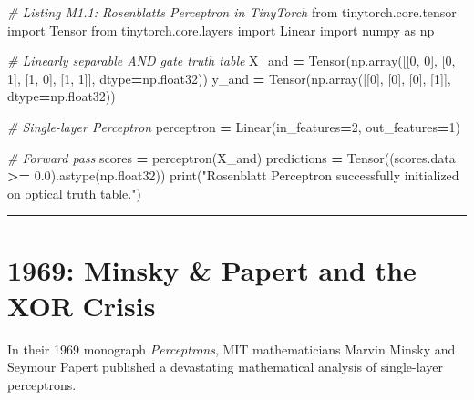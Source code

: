 \documentclass[
  letterpaper,
]{scrbook}
\newenvironment{Shaded}{\begin{snugshade}}{\end{snugshade}}
\newcommand{\BuiltInTok}[1]{#1}
\newcommand{\CommentTok}[1]{\textcolor[rgb]{0.56,0.35,0.01}{\textit{#1}}}
\newcommand{\DecValTok}[1]{\textcolor[rgb]{0.00,0.00,0.81}{#1}}
\newcommand{\FloatTok}[1]{\textcolor[rgb]{0.00,0.00,0.81}{#1}}
\newcommand{\ImportTok}[1]{#1}
\newcommand{\NormalTok}[1]{#1}
\newcommand{\OperatorTok}[1]{\textcolor[rgb]{0.81,0.36,0.00}{\textbf{#1}}}
\newcommand{\StringTok}[1]{\textcolor[rgb]{0.31,0.60,0.02}{#1}}
\begin{document}
\begin{Shaded}
\begin{Highlighting}[]
\CommentTok{\# Listing M1.1: Rosenblatt\textquotesingle{}s Perceptron in TinyTorch}
\ImportTok{from}\NormalTok{ tinytorch.core.tensor }\ImportTok{import}\NormalTok{ Tensor}
\ImportTok{from}\NormalTok{ tinytorch.core.layers }\ImportTok{import}\NormalTok{ Linear}
\ImportTok{import}\NormalTok{ numpy }\ImportTok{as}\NormalTok{ np}

\CommentTok{\# Linearly separable AND gate truth table}
\NormalTok{X\_and }\OperatorTok{=}\NormalTok{ Tensor(np.array([[}\DecValTok{0}\NormalTok{, }\DecValTok{0}\NormalTok{], [}\DecValTok{0}\NormalTok{, }\DecValTok{1}\NormalTok{], [}\DecValTok{1}\NormalTok{, }\DecValTok{0}\NormalTok{], [}\DecValTok{1}\NormalTok{, }\DecValTok{1}\NormalTok{]], dtype}\OperatorTok{=}\NormalTok{np.float32))}
\NormalTok{y\_and }\OperatorTok{=}\NormalTok{ Tensor(np.array([[}\DecValTok{0}\NormalTok{], [}\DecValTok{0}\NormalTok{], [}\DecValTok{0}\NormalTok{], [}\DecValTok{1}\NormalTok{]], dtype}\OperatorTok{=}\NormalTok{np.float32))}

\CommentTok{\# Single{-}layer Perceptron}
\NormalTok{perceptron }\OperatorTok{=}\NormalTok{ Linear(in\_features}\OperatorTok{=}\DecValTok{2}\NormalTok{, out\_features}\OperatorTok{=}\DecValTok{1}\NormalTok{)}

\CommentTok{\# Forward pass}
\NormalTok{scores }\OperatorTok{=}\NormalTok{ perceptron(X\_and)}
\NormalTok{predictions }\OperatorTok{=}\NormalTok{ Tensor((scores.data }\OperatorTok{\textgreater{}=} \FloatTok{0.0}\NormalTok{).astype(np.float32))}
\BuiltInTok{print}\NormalTok{(}\StringTok{"Rosenblatt Perceptron successfully initialized on optical truth table."}\NormalTok{)}
\end{Highlighting}
\end{Shaded}

\begin{center}\rule{0.5\linewidth}{0.5pt}\end{center}

\section*{1969: Minsky \& Papert and the XOR
Crisis}\label{minsky-papert-and-the-xor-crisis}


In their 1969 monograph \emph{Perceptrons}, MIT mathematicians Marvin
Minsky and Seymour Papert published a devastating mathematical analysis
of single-layer perceptrons.
\end{document}
